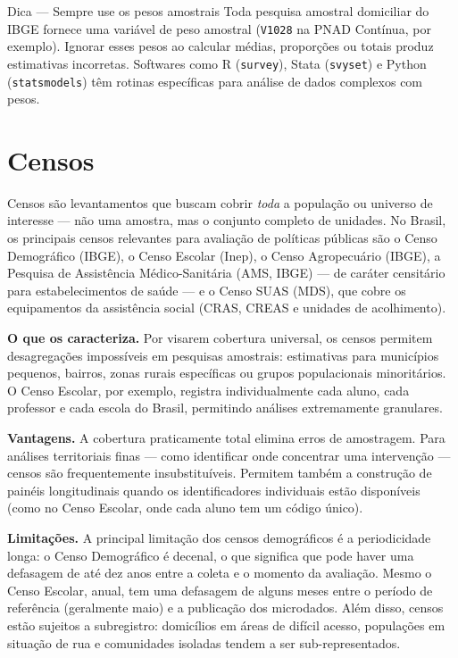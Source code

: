 \begin{boxdica}{Dica — Sempre use os pesos amostrais}
Toda pesquisa amostral domiciliar do IBGE fornece uma variável de peso amostral (\texttt{V1028} na PNAD Contínua, por exemplo). Ignorar esses pesos ao calcular médias, proporções ou totais produz estimativas incorretas. Softwares como R (\texttt{survey}), Stata (\texttt{svyset}) e Python (\texttt{statsmodels}) têm rotinas específicas para análise de dados complexos com pesos.
\end{boxdica}

\section{Censos}

Censos são levantamentos que buscam cobrir \textit{toda} a população ou universo de interesse — não uma amostra, mas o conjunto completo de unidades. No Brasil, os principais censos relevantes para avaliação de políticas públicas são o Censo Demográfico (IBGE), o Censo Escolar (Inep), o Censo Agropecuário (IBGE), a Pesquisa de Assistência Médico-Sanitária (AMS, IBGE) --- de caráter censitário para estabelecimentos de saúde --- e o Censo SUAS (MDS), que cobre os equipamentos da assistência social (CRAS, CREAS e unidades de acolhimento).

\textbf{O que os caracteriza.} Por visarem cobertura universal, os censos permitem desagregações impossíveis em pesquisas amostrais: estimativas para municípios pequenos, bairros, zonas rurais específicas ou grupos populacionais minoritários. O Censo Escolar, por exemplo, registra individualmente cada aluno, cada professor e cada escola do Brasil, permitindo análises extremamente granulares.

\textbf{Vantagens.} A cobertura praticamente total elimina erros de amostragem. Para análises territoriais finas — como identificar onde concentrar uma intervenção — censos são frequentemente insubstituíveis. Permitem também a construção de painéis longitudinais quando os identificadores individuais estão disponíveis (como no Censo Escolar, onde cada aluno tem um código único).

\textbf{Limitações.} A principal limitação dos censos demográficos é a periodicidade longa: o Censo Demográfico é decenal, o que significa que pode haver uma defasagem de até dez anos entre a coleta e o momento da avaliação. Mesmo o Censo Escolar, anual, tem uma defasagem de alguns meses entre o período de referência (geralmente maio) e a publicação dos microdados. Além disso, censos estão sujeitos a subregistro: domicílios em áreas de difícil acesso, populações em situação de rua e comunidades isoladas tendem a ser sub-representados.

